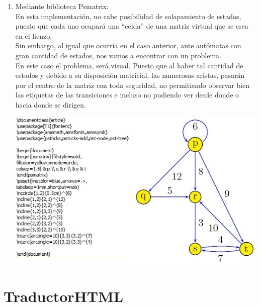 \documentclass[12pt,a4paper,spanish]{book}
\begin{document}
\begin{itemize}
\begin{enumerate}
\item Mediante biblioteca Psmatrix:\\
\newline
En esta implementaci\'on, no cabe posibilidad de solapamiento de estados, puesto que cada uno ocupar\'a una ``celda'' de una matriz virtual que se crea en el lienzo.\\
Sin embargo, al igual que ocurr\'ia en el caso anterior, ante aut\'omatas con gran cantidad de estados, nos vamos a encontrar con un problema.\\
\newline
En este caso el problema, ser\'a visual. Puesto que al haber tal cantidad de estados y debido a su disposici\'on matricial, las numerosas aristas, pasar\'an por el centro de la matriz con toda seguridad, no permitiendo observar bien las etiquetas de las transiciones e incluso no pudiendo ver desde donde o hacia donde se dirigen.
\begin{center}
\includegraphics{late.jpg}
\end{center}
\end{enumerate}
\end{itemize} 
\newpage

\section{TraductorHTML}
\end{document}
